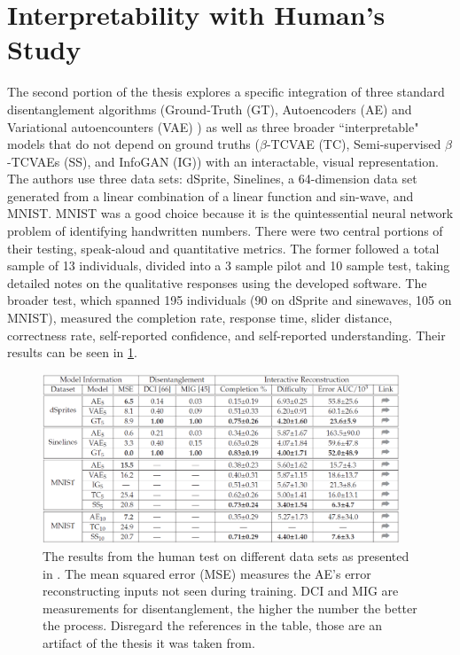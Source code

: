 \documentclass[twoside,11pt]{article}
\begin{document}

\section{Interpretability with Human's Study}
\label{sec:explainability}
The second portion of the thesis explores a specific integration of three standard disentanglement algorithms (Ground-Truth (GT), Autoencoders (AE) \citep{hinton2006reducing} and Variational autoencounters (VAE) \citep{kingma2013auto}) as well as three broader ``interpretable" models that do not depend on ground truths ($\beta$-TCVAE (TC)\citep{chen2018isolating}, Semi-supervised $\beta$-TCVAEs (SS), and InfoGAN (IG)\citep{chen2016infogan}) with an interactable, visual representation. The authors use three data sets: dSprite, Sinelines, a 64-dimension data set generated from a linear combination of a linear function and sin-wave, and MNIST. MNIST was a good choice because it is the quintessential neural network problem of identifying handwritten numbers. There were two central portions of their testing, speak-aloud and quantitative metrics. The former followed a total sample of 13 individuals, divided into a 3 sample pilot and 10 sample test, taking detailed notes on the qualitative responses using the developed software. The broader test, which spanned 195 individuals (90 on dSprite and sinewaves, 105 on MNIST), measured the completion rate, response time, slider distance, correctness rate, self-reported confidence, and self-reported understanding. Their results can be seen in \cref{fig:3}. 

\begin{figure}[!ht]
\centering
	\includegraphics[width=0.95\textwidth]{dis_fig3.png}
	\caption{The results from the human test on different data sets as presented in \cite{ross2017right}. The mean squared error (MSE) measures the AE's error reconstructing inputs not seen during training. DCI and MIG are measurements for disentanglement, the higher the number the better the process. Disregard the references in the table, those are an artifact of the thesis it was taken from.}
	\label{fig:3}
\end{figure}
\end{document}

